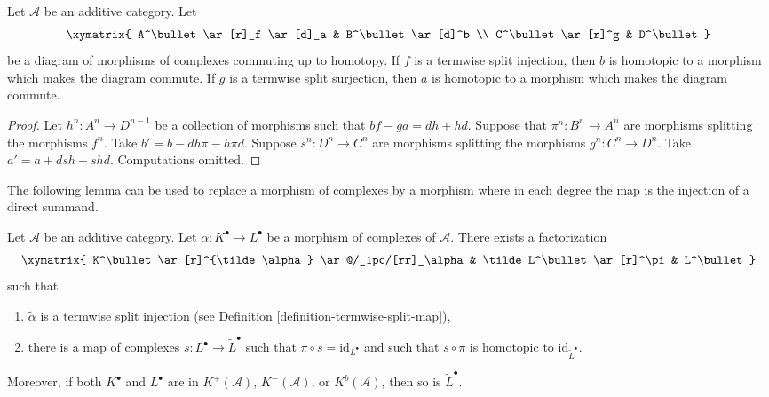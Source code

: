 \begin{lemma}
\label{lemma-make-commute-map}
Let $\mathcal{A}$ be an additive category.
Let
$$
\xymatrix{
A^\bullet \ar[r]_f \ar[d]_a & B^\bullet \ar[d]^b \\
C^\bullet \ar[r]^g & D^\bullet
}
$$
be a diagram of morphisms of complexes commuting up to homotopy.
If $f$ is a termwise split injection, then $b$ is homotopic to a
morphism which makes the diagram commute.
If $g$ is a termwise split surjection, then $a$ is homotopic to a
morphism which makes the diagram commute.
\end{lemma}

\begin{proof}
Let $h^n : A^n \to D^{n - 1}$ be a collection of morphisms
such that $bf - ga = dh + hd$. Suppose that $\pi^n : B^n \to A^n$
are morphisms splitting the morphisms $f^n$.
Take $b' = b - dh\pi - h\pi d$.
Suppose $s^n : D^n \to C^n$ are morphisms splitting the morphisms
$g^n : C^n \to D^n$. Take $a' = a + dsh + shd$.
Computations omitted.
\end{proof}

\noindent
The following lemma can be used to replace a morphism of complexes
by a morphism where in each degree the map is the injection of a
direct summand.

\begin{lemma}
\label{lemma-make-injective}
Let $\mathcal{A}$ be an additive category.
Let $\alpha : K^\bullet \to L^\bullet$ be a morphism
of complexes of $\mathcal{A}$.
There exists a factorization
$$
\xymatrix{
K^\bullet \ar[r]^{\tilde \alpha} \ar@/_1pc/[rr]_\alpha &
\tilde L^\bullet \ar[r]^\pi &
L^\bullet
}
$$
such that
\begin{enumerate}
\item $\tilde \alpha$ is a termwise split injection (see
Definition \ref{definition-termwise-split-map}),
\item there is a map of complexes $s : L^\bullet \to \tilde L^\bullet$
such that $\pi \circ s = \text{id}_{L^\bullet}$ and such that
$s \circ \pi$ is homotopic to $\text{id}_{\tilde L^\bullet}$.
\end{enumerate}
Moreover, if both $K^\bullet$ and $L^\bullet$ are in
$K^{+}(\mathcal{A})$, $K^{-}(\mathcal{A})$, or $K^b(\mathcal{A})$,
then so is $\tilde L^\bullet$.
\end{lemma}

